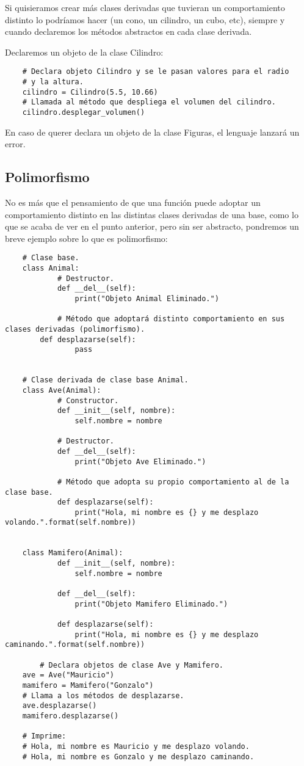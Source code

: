 Si quisieramos crear más clases derivadas que tuvieran un comportamiento distinto lo podríamos hacer (un cono, un cilindro, un cubo, etc), siempre y cuando declaremos los métodos abstractos en cada clase derivada.

Declaremos un objeto de la clase Cilindro:
\begin{lstlisting}
	# Declara objeto Cilindro y se le pasan valores para el radio
	# y la altura.
	cilindro = Cilindro(5.5, 10.66)
	# Llamada al método que despliega el volumen del cilindro.
	cilindro.desplegar_volumen()
\end{lstlisting}

En caso de querer declara un objeto de la clase Figuras, el lenguaje lanzará un error.


\subsection{Polimorfismo}

No es más que el pensamiento de que una función puede adoptar un comportamiento distinto en las distintas clases derivadas de una base, como lo que se acaba de ver en el punto anterior, pero sin ser abstracto, pondremos un breve ejemplo sobre lo que es polimorfismo:
\begin{lstlisting}
	# Clase base.
	class Animal:
    		# Destructor.
    		def __del__(self):
        		print("Objeto Animal Eliminado.")

    		# Método que adoptará distinto comportamiento en sus clases derivadas (polimorfismo).
   		def desplazarse(self):
        		pass


	# Clase derivada de clase base Animal.
	class Ave(Animal):
    		# Constructor.
    		def __init__(self, nombre):
        		self.nombre = nombre

    		# Destructor.
    		def __del__(self):
        		print("Objeto Ave Eliminado.")

    		# Método que adopta su propio comportamiento al de la clase base.
    		def desplazarse(self):
        		print("Hola, mi nombre es {} y me desplazo volando.".format(self.nombre))


	class Mamifero(Animal):
    		def __init__(self, nombre):
        		self.nombre = nombre

    		def __del__(self):
        		print("Objeto Mamifero Eliminado.")

    		def desplazarse(self):
        		print("Hola, mi nombre es {} y me desplazo caminando.".format(self.nombre))
    
    	# Declara objetos de clase Ave y Mamifero.
	ave = Ave("Mauricio")
	mamifero = Mamifero("Gonzalo")
	# Llama a los métodos de desplazarse.
	ave.desplazarse()
	mamifero.desplazarse()
	
	# Imprime:
	# Hola, mi nombre es Mauricio y me desplazo volando.
	# Hola, mi nombre es Gonzalo y me desplazo caminando.
\end{lstlisting}

